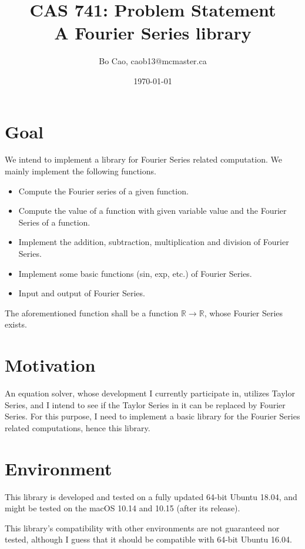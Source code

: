\documentclass{article}
\title{CAS 741: Problem Statement\\A Fourier Series library}
\author{Bo Cao, caob13@mcmaster.ca}
\date{\today}
\begin{document}
\maketitle

\section{Goal}
We intend to implement a library for Fourier Series related computation. We mainly implement the following functions.
\begin{itemize}
	\item Compute the Fourier series of a given function.
	\item Compute the value of a function with given variable value and the Fourier Series of a function.
	\item Implement the addition, subtraction, multiplication and division of Fourier Series.
	\item Implement some basic functions (sin, exp, etc.) of Fourier Series.
	\item Input and output of Fourier Series. 
\end{itemize}

The aforementioned function shall be a function $\mathbb{R}\rightarrow\mathbb{R}$, whose Fourier Series exists.

\section{Motivation}
An equation solver, whose development I currently participate in, utilizes Taylor Series, and I intend to see if the Taylor Series in it can be replaced by Fourier Series. For this purpose, I need to implement a basic library for the Fourier Series related computations, hence this library.

\section{Environment}
This library is developed and tested on a fully updated 64-bit Ubuntu 18.04, and might be tested on the macOS 10.14 and 10.15 (after its release). 

This library's compatibility with other environments are not guaranteed nor tested, although I guess that it should be compatible with 64-bit Ubuntu 16.04.
  
%
%
%
%
\end{document}
